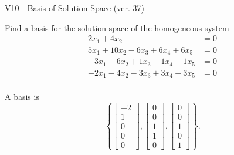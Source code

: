 \begin{exercise}
  \begin{exerciseTitle}V10 - Basis of Solution Space (ver. 37)\end{exerciseTitle}
  \begin{exerciseStatement}
    Find a basis for the solution space of the homogeneous system 
\begin{align*}
 2 x_ 1 + 4 x_ 2 &= 0  \\ 
  5 x_ 1 + 10 x_ 2 -6 x_ 3 + 6 x_ 4 + 6 x_ 5 &= 0  \\ 
  -3 x_ 1 -6 x_ 2 + 1 x_ 3 -1 x_ 4 -1 x_ 5 &= 0  \\ 
  -2 x_ 1 -4 x_ 2 -3 x_ 3 + 3 x_ 4 + 3 x_ 5 &= 0  \\ 
 \end{align*}


 
  \end{exerciseStatement}

  \begin{exerciseAnswer}
   A basis is   
\[\left\{\left[\begin{array}{c}
-2 \\
1 \\
0 \\
0 \\
0
\end{array}\right] , \left[\begin{array}{c}
0 \\
0 \\
1 \\
1 \\
0
\end{array}\right] , \left[\begin{array}{c}
0 \\
0 \\
1 \\
0 \\
1
\end{array}\right]\right\}.\]

  


  \end{exerciseAnswer}
\end{exercise}